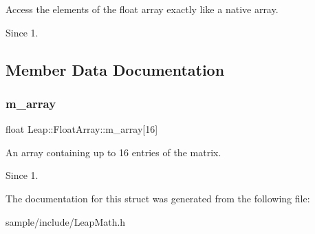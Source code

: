 Access the elements of the float array exactly like a native array. \begin{DoxySince}{Since}
1. 
\end{DoxySince}


\subsection{Member Data Documentation}
\mbox{\label{struct_leap_1_1_float_array_a6f3a08d99f887c2f7afeb90955565a90}} 
\subsubsection{\texorpdfstring{m\+\_\+array}{m\_array}}
{\footnotesize\ttfamily float Leap\+::\+Float\+Array\+::m\+\_\+array\mbox{[}16\mbox{]}}

An array containing up to 16 entries of the matrix. \begin{DoxySince}{Since}
1. 
\end{DoxySince}


The documentation for this struct was generated from the following file\+:\begin{DoxyCompactItemize}
\item 
sample/include/Leap\+Math.\+h\end{DoxyCompactItemize}
